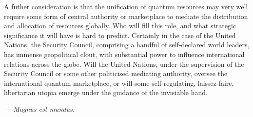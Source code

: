 A futher consideration is that the unification of quantum resources may very well require some form of central authority or marketplace to mediate the distribution and allocation of resources globally. Who will fill this role, and what strategic significance it will have is hard to predict. Certainly in the case of the United Nations, the Security Council, comprising a handful of self-declared world leaders, has immense geopolitical clout, with substantial power to influence international relations across the globe. Will the United Nations, under the supervision of the Security Council or some other politicised mediating authority, oversee the international quantum marketplace, or will some self-regulating, laissez-faire, libertarian utopia emerge under the guidance of the invisiable hand. 

\textit{--- Magnus est mundus.}